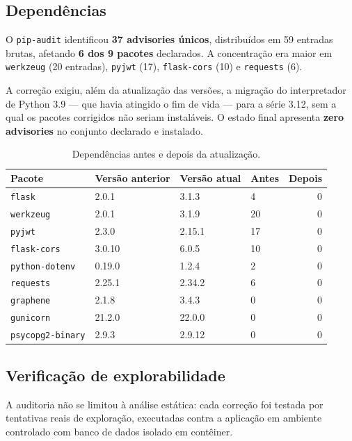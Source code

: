 \documentclass[12pt,a4paper]{article}
\begin{document}
\subsection{Dependências}

O \texttt{pip-audit} identificou \textbf{37 advisories únicos}, distribuídos
em 59 entradas brutas, afetando \textbf{6 dos 9 pacotes} declarados. A
concentração era maior em \texttt{werkzeug} (20 entradas), \texttt{pyjwt} (17),
\texttt{flask-cors} (10) e \texttt{requests} (6).

A correção exigiu, além da atualização das versões, a migração do interpretador
de Python 3.9 --- que havia atingido o fim de vida --- para a série 3.12, sem
a qual os pacotes corrigidos não seriam instaláveis. O estado final apresenta
\textbf{zero advisories} no conjunto declarado e instalado.

\begin{table}[H]
\centering
\caption{Dependências antes e depois da atualização.}
\begin{tabularx}{\textwidth}{@{}lXlXr@{}}
\toprule
\textbf{Pacote} & \textbf{Versão anterior} & \textbf{Versão atual} & \textbf{Antes} & \textbf{Depois} \\
\midrule
\texttt{flask}          & 2.0.1   & 3.1.3   & 4  & 0 \\
\texttt{werkzeug}       & 2.0.1   & 3.1.9   & 20 & 0 \\
\texttt{pyjwt}          & 2.3.0   & 2.15.1  & 17 & 0 \\
\texttt{flask-cors}     & 3.0.10  & 6.0.5   & 10 & 0 \\
\texttt{python-dotenv}  & 0.19.0  & 1.2.4   & 2  & 0 \\
\texttt{requests}       & 2.25.1  & 2.34.2  & 6  & 0 \\
\texttt{graphene}       & 2.1.8   & 3.4.3   & 0  & 0 \\
\texttt{gunicorn}       & 21.2.0  & 22.0.0  & 0  & 0 \\
\texttt{psycopg2-binary} & 2.9.3  & 2.9.12  & 0  & 0 \\
\bottomrule
\end{tabularx}
\end{table}

\subsection{Verificação de explorabilidade}

A auditoria não se limitou à análise estática: cada correção foi testada por
tentativas reais de exploração, executadas contra a aplicação em ambiente
controlado com banco de dados isolado em contêiner.
\end{document}
